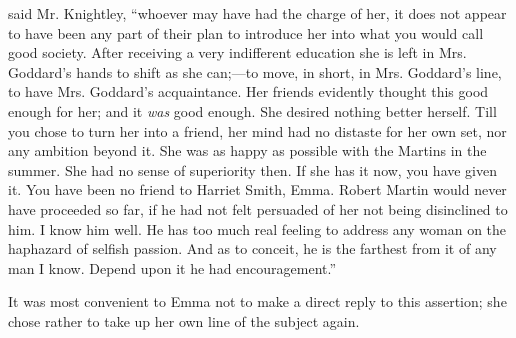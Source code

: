 

 said Mr. Knightley, “whoever may have had the charge of her, it does not appear to have been any part of their plan to introduce her into what you would call good society. After receiving a very indifferent education she is left in Mrs. Goddard's hands to shift as she can;---to move, in short, in Mrs. Goddard's line, to have Mrs. Goddard's acquaintance. Her friends evidently thought this good enough for her; and it {\em was} good enough. She desired nothing better herself. Till you chose to turn her into a friend, her mind had no distaste for her own set, nor any ambition beyond it. She was as happy as possible with the Martins in the summer. She had no sense of superiority then. If she has it now, you have given it. You have been no friend to Harriet Smith, Emma. Robert Martin would never have proceeded so far, if he had not felt persuaded of her not being disinclined to him. I know him well. He has too much real feeling to address any woman on the haphazard of selfish passion. And as to conceit, he is the farthest from it of any man I know. Depend upon it he had encouragement.”

It was most convenient to Emma not to make a direct reply to this assertion; she chose rather to take up her own line of the subject again.

